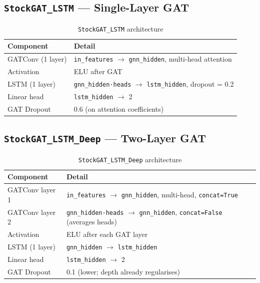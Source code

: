 \documentclass[12pt,a4paper]{article}
\newcommand{\codeinline}[1]{\texttt{\small #1}}
\begin{document}
\subsection{\texttt{StockGAT\_LSTM} — Single-Layer GAT}

\begin{table}[H]
\centering
\begin{tabular}{L{3.5cm} L{9cm}}
\toprule
\textbf{Component} & \textbf{Detail} \\
\midrule
GATConv (1 layer) & \codeinline{in\_features} $\to$ \codeinline{gnn\_hidden}, multi-head attention \\
Activation        & ELU after GAT \\
LSTM (1 layer)    & \codeinline{gnn\_hidden·heads} $\to$ \codeinline{lstm\_hidden}, dropout = 0.2 \\
Linear head       & \codeinline{lstm\_hidden} $\to$ 2 \\
GAT Dropout       & 0.6 (on attention coefficients) \\
\bottomrule
\end{tabular}
\caption{\texttt{StockGAT\_LSTM} architecture}
\end{table}

\subsection{\texttt{StockGAT\_LSTM\_Deep} — Two-Layer GAT}

\begin{table}[H]
\centering
\begin{tabular}{L{3.5cm} L{9cm}}
\toprule
\textbf{Component} & \textbf{Detail} \\
\midrule
GATConv layer 1 & \codeinline{in\_features} $\to$ \codeinline{gnn\_hidden}, multi-head, \codeinline{concat=True} \\
GATConv layer 2 & \codeinline{gnn\_hidden·heads} $\to$ \codeinline{gnn\_hidden}, \codeinline{concat=False} (averages heads) \\
Activation      & ELU after each GAT layer \\
LSTM (1 layer)  & \codeinline{gnn\_hidden} $\to$ \codeinline{lstm\_hidden} \\
Linear head     & \codeinline{lstm\_hidden} $\to$ 2 \\
GAT Dropout     & 0.1 (lower; depth already regularises) \\
\bottomrule
\end{tabular}
\caption{\texttt{StockGAT\_LSTM\_Deep} architecture}
\end{table}
\end{document}
